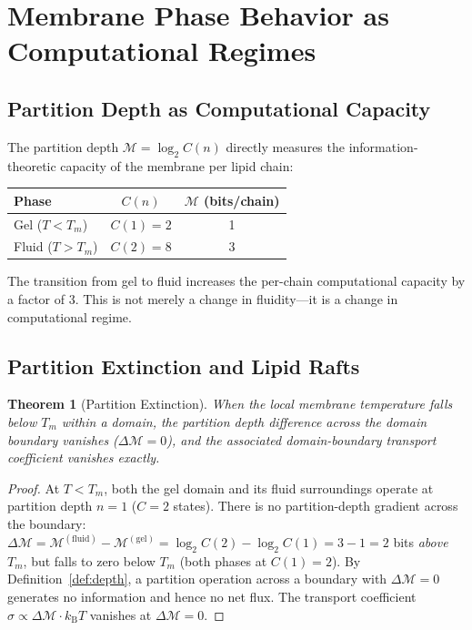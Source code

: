 \documentclass[11pt,twocolumn,a4paper]{article}
\newtheorem{theorem}{Theorem}[section]
\theoremstyle{definition}
\theoremstyle{remark}
\newcommand{\kB}{k_{\mathrm{B}}}
\newcommand{\Mpart}{\mathcal{M}}
\begin{document}
\section{Membrane Phase Behavior as Computational Regimes}
\label{sec:regimes}

\subsection{Partition Depth as Computational Capacity}

The partition depth $\Mpart = \log_2 C(n)$ directly measures the
information-theoretic capacity of the membrane per lipid chain:

\begin{center}
\begin{tabular}{lcc}
\toprule
Phase & $C(n)$ & $\Mpart$ (bits/chain) \\
\midrule
Gel ($T < T_m$)    & $C(1) = 2$ & 1 \\
Fluid ($T > T_m$)  & $C(2) = 8$ & 3 \\
\bottomrule
\end{tabular}
\end{center}

\noindent
The transition from gel to fluid increases the per-chain computational
capacity by a factor of 3. This is not merely a change in
fluidity---it is a change in computational regime.

\subsection{Partition Extinction and Lipid Rafts}

\begin{theorem}[Partition Extinction]
\label{thm:extinction}
When the local membrane temperature falls below $T_m$ within a domain,
the partition depth difference across the domain boundary vanishes
($\Delta\Mpart = 0$), and the associated domain-boundary transport
coefficient vanishes exactly.
\end{theorem}

\begin{proof}
At $T < T_m$, both the gel domain and its fluid surroundings operate at
partition depth $n = 1$ ($C = 2$ states). There is no partition-depth
gradient across the boundary: $\Delta\Mpart = \Mpart^{(\text{fluid})}
- \Mpart^{(\text{gel})} = \log_2 C(2) - \log_2 C(1) = 3 - 1 = 2$ bits
\emph{above} $T_m$, but falls to zero below $T_m$ (both phases at $C(1) = 2$).
By Definition~\ref{def:depth}, a partition operation across a boundary with
$\Delta\Mpart = 0$ generates no information and hence no net flux. The
transport coefficient $\sigma \propto \Delta\Mpart \cdot \kB T$ vanishes
at $\Delta\Mpart = 0$.
\end{proof}
\end{document}
